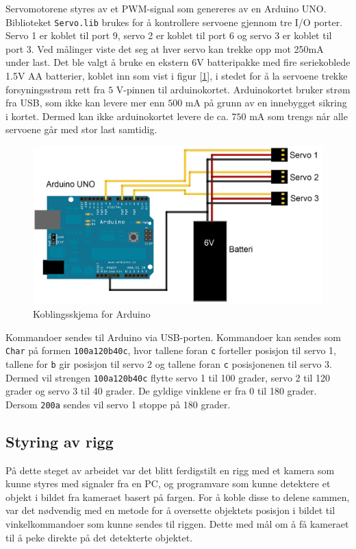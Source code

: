 Servomotorene styres av et PWM-signal som genereres av en Arduino UNO. Biblioteket \texttt{Servo.lib} brukes for å kontrollere servoene gjennom tre I/O porter. Servo 1 er koblet til port 9, servo 2 er koblet til port 6 og servo 3 er koblet til port 3. Ved målinger viste det seg at hver servo kan trekke opp mot 250mA under last. Det ble valgt å bruke en ekstern 6V batteripakke med fire seriekoblede 1.5V AA batterier, koblet inn som vist i figur [\ref{fig:ArduSkjem}], i stedet for å la servoene trekke forsyningsstrøm rett fra $5$ V-pinnen til arduinokortet. Arduinokortet bruker strøm fra USB, som ikke kan levere mer enn $500$ mA på grunn av en innebygget sikring i kortet. Dermed kan ikke arduinokortet levere de ca. $750$ mA som trengs når alle servoene går med stor last samtidig.

\begin{figure}[h!]
	\centering
	\includegraphics[scale=0.25]{img/KoblingsskjemaArduino.png}
	\caption{Koblingsskjema for Arduino}
	\label{fig:ArduSkjem}
\end{figure}  

Kommandoer sendes til Arduino via USB-porten. Kommandoer kan sendes som \texttt{Char} på formen \texttt{100a120b40c}, hvor tallene foran \texttt{c} forteller posisjon til servo 1, tallene for \texttt{b} gir posisjon til servo 2 og tallene foran \texttt{c} posisjonenen til servo 3. Dermed vil strengen \texttt{100a120b40c} flytte servo 1 til 100 grader, servo 2 til 120 grader og servo 3 til 40 grader. De gyldige vinklene er fra 0 til 180 grader. Dersom \texttt{200a} sendes vil servo 1 stoppe på 180 grader. 

\subsection{Styring av rigg}

På dette steget av arbeidet var det blitt ferdigstilt en rigg med et kamera som kunne styres med signaler fra en PC, og programvare som kunne detektere et objekt i bildet fra kameraet basert på fargen. For å koble disse to delene sammen, var det nødvendig med en metode for å oversette objektets posisjon i bildet til vinkelkommandoer som kunne sendes til riggen. Dette med mål om å få kameraet til å peke direkte på det detekterte objektet.


